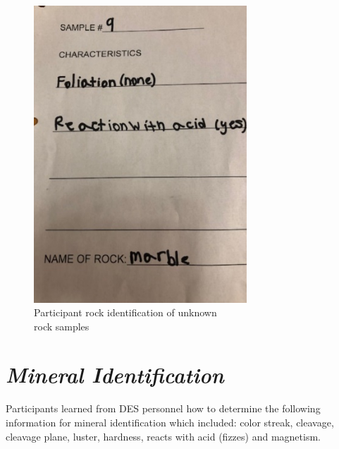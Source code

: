 \documentclass[11.5pt]{sig-alternate}
\begin{document}
\begin{large}
    \begin{figure}[h]
      \renewcommand{\thefigure}{4b}
        \centering
        \includegraphics[width=8cm]{figure4_2.png}
        \caption{Participant rock identification of unknown \\rock samples }
        \label{ Participant rock identification of unknown rock samples}
\end{figure}
\newpage
\section*{\textit{Mineral Identification }}
Participants learned from DES personnel how to determine the following information for mineral identification which included: color streak, cleavage, cleavage plane, luster, hardness, reacts with acid (fizzes) and magnetism. 


\end{large}
\end{document}
